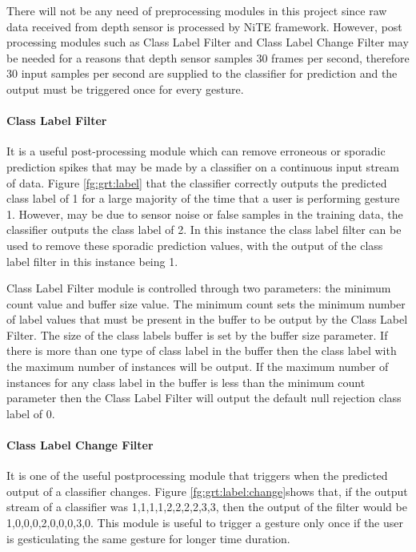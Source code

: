 There will not be any need of preprocessing modules in this project since raw data received from depth sensor is processed by NiTE framework. However, post processing modules such as Class Label Filter and Class Label Change Filter may be needed for a reasons that depth sensor samples 30 frames per second, therefore 30 input samples per second are supplied to the classifier for prediction and the output must be triggered once for every gesture. 



\paragraph*{Class Label Filter} It is a useful post-processing module which can remove erroneous or sporadic prediction spikes that may be made by a classifier on a continuous input stream of data. Figure \ref{fg:grt:label} that the classifier correctly outputs the predicted class label of 1 for a large majority of the time that a user is performing gesture 1. However, may be due to sensor noise or false samples in the training data, the classifier outputs the class label of 2. In this instance the class label filter can be used to remove these sporadic prediction values, with the output of the class label filter in this instance being 1. 

Class Label Filter module is controlled through two parameters: the minimum count value and buffer size value. The minimum count sets the minimum number of label values that must be present in the buffer to be output by the Class Label Filter. The size of the class labels buffer is set by the buffer size parameter. If there is more than one type of class label in the buffer then the class label with the maximum number of instances will be output. If the maximum number of instances for any class label in the buffer is less than the minimum count parameter then the Class Label Filter will output the default null rejection class label of 0.



\paragraph*{Class Label Change Filter} It is one of the useful postprocessing module that triggers when the predicted output of a classifier changes. Figure \ref{fg:grt:label:change}shows that, if the output stream of a classifier was {1,1,1,1,2,2,2,2,3,3}, then the output of the filter would be {1,0,0,0,2,0,0,0,3,0}. This module is useful to trigger a gesture only once if the user is gesticulating the same gesture for longer time duration. 

